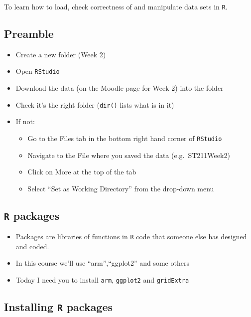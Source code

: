 \documentclass[
]{gitbook}
\providecommand{\tightlist}{%
  \setlength{\itemsep}{0pt}\setlength{\parskip}{0pt}}
\begin{document}
To learn how to load, check correctness of and manipulate data sets in \texttt{R}.

\hypertarget{preamble}{%
\subsection{Preamble}\label{preamble}}

\begin{itemize}
\tightlist
\item
  Create a new folder (Week 2)
\item
  Open \texttt{RStudio}
\item
  Download the data (on the Moodle page for Week 2) into the folder
\item
  Check it's the right folder (\texttt{dir()} lists what is in it)
\item
  If not:

  \begin{itemize}
  \tightlist
  \item
    Go to the Files tab in the bottom right hand corner of \texttt{RStudio}
  \item
    Navigate to the File where you saved the data (e.g.~ST211Week2)
  \item
    Click on More at the top of the tab
  \item
    Select ``Set as Working Directory'' from the drop-down menu
  \end{itemize}
\end{itemize}

\hypertarget{r-packages}{%
\subsection{\texorpdfstring{\texttt{R} packages}{R packages}}\label{r-packages}}

\begin{itemize}
\tightlist
\item
  Packages are libraries of functions in \texttt{R} code that someone else has designed and coded.
\item
  In this course we'll use ``arm'',``ggplot2'' and some others
\item
  Today I need you to install \texttt{arm}, \texttt{ggplot2} and \texttt{gridExtra}
\end{itemize}

\hypertarget{installing-r-packages}{%
\subsection{\texorpdfstring{Installing \texttt{R} packages}{Installing R packages}}\label{installing-r-packages}}
\end{document}

